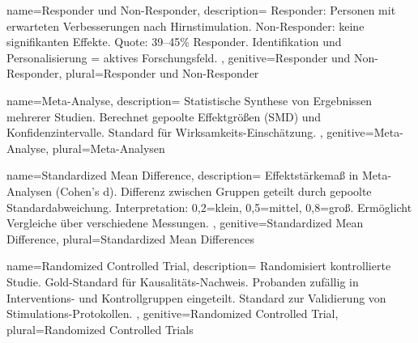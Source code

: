 	{
		name=Responder und Non-Responder,
		description={
				Responder: Personen mit erwarteten Verbesserungen nach Hirnstimulation. Non-Responder: keine signifikanten Effekte. Quote: 39--45\% Responder. Identifikation und Personalisierung = aktives Forschungsfeld. \cite{vergallito_inter-individual_2022}
			},
		genitive=Responder und Non-Responder,
		plural=Responder und Non-Responder
	}

	{
		name=Meta-Analyse,
		description={
				Statistische Synthese von Ergebnissen mehrerer Studien. Berechnet gepoolte Effektgrößen (\gls{SMD}) und Konfidenzintervalle. Standard für Wirksamkeits-Einschätzung. \cite{senkowski_boosting_2022, simonsmeier_electrical_2018}
			},
		genitive=Meta-Analyse,
		plural=Meta-Analysen
	}

	{
		name=Standardized Mean Difference,
		description={
				Effektstärkemaß in Meta-Analysen (Cohen's d). Differenz zwischen Gruppen geteilt durch gepoolte Standardabweichung. Interpretation: 0,2=klein, 0,5=mittel, 0,8=groß. Ermöglicht Vergleiche über verschiedene Messungen. \cite{senkowski_boosting_2022}
			},
		genitive=Standardized Mean Difference,
		plural=Standardized Mean Differences
	}


	{
		name=Randomized Controlled Trial,
		description={
				Randomisiert kontrollierte Studie. Gold-Standard für Kausalitäts-Nachweis. Probanden zufällig in Interventions- und Kontrollgruppen eingeteilt. Standard zur Validierung von Stimulations-Protokollen.
			},
		genitive=Randomized Controlled Trial,
		plural=Randomized Controlled Trials
	}

\fi

